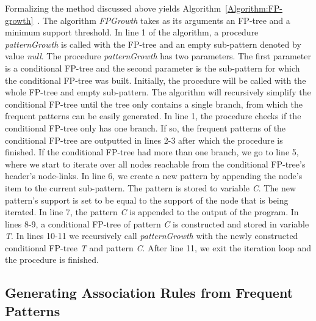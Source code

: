 Formalizing the method discussed above yields Algorithm~\ref{Algorithm:FP-growth}~\cite{Hipp:2000:AAR:360402.360421}. The algorithm \textit{FPGrowth} takes as its arguments an FP-tree and a minimum support threshold. In line 1 of the algorithm, a procedure \textit{patternGrowth} is called with the FP-tree and an empty sub-pattern denoted by value \textit{null}. The procedure \textit{patternGrowth} has two parameters. The first parameter is a conditional FP-tree and the second parameter is the sub-pattern for which the conditional FP-tree was built. Initially, the procedure will be called with the whole FP-tree and empty sub-pattern. The algorithm will recursively simplify the conditional FP-tree until the tree only contains a single branch, from which the frequent patterns can be easily generated. In line 1, the procedure checks if the conditional FP-tree only has one branch. If so, the frequent patterns of the conditional FP-tree are outputted in lines 2-3 after which the procedure is finished. If the conditional FP-tree had more than one branch, we go to line 5, where we start to iterate over all nodes reachable from the conditional FP-tree's header's node-links. In line 6, we create a new pattern by appending the node's item to the current sub-pattern. The pattern is stored to variable \textit{C}. The new pattern's support is set to be equal to the support of the node that is being iterated. In line 7, the pattern \textit{C} is appended to the output of the program. In lines 8-9, a conditional FP-tree of pattern \textit{C} is constructed and stored in variable \textit{T}. In lines 10-11 we recursively call \textit{patternGrowth} with the newly constructed conditional FP-tree \textit{T} and pattern \textit{C}. After line 11, we exit the iteration loop and the procedure is finished.           

\subsection{Generating Association Rules from Frequent Patterns}

